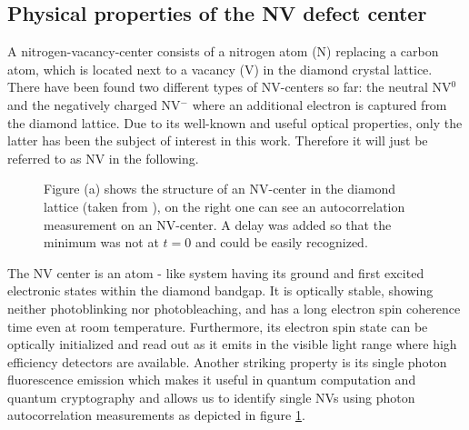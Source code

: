 \documentclass[12pt,a4paper]{article}
\begin{document}
\subsection{Physical properties of the NV defect center}
A nitrogen-vacancy-center consists of a nitrogen atom (N) replacing a carbon atom, which is located next to a vacancy (V) in the diamond crystal lattice. There have been found two different types of NV-centers so far: the neutral NV$^0$ and the negatively charged NV$^-$ where an additional electron is captured from the diamond lattice. Due to its well-known and useful optical properties, only the latter has been the subject of interest in this work. Therefore it will just be referred to as NV in the following. \\
\begin{figure}[H]
    \caption{Figure (a) shows the structure of an NV-center in the diamond lattice (taken from \cite{repprog}), on the right one can see an autocorrelation measurement on an NV-center. A delay was added so that the minimum was not at $t=0$ and could be easily recognized.}
\label{acm} 
\end{figure}
The NV center is an atom - like system having its ground and first excited electronic states within the diamond bandgap. It is optically stable, showing neither photoblinking nor photobleaching, and has a long electron spin coherence time even at room temperature. Furthermore, its electron spin state can be optically initialized and read out as it emits in the visible light range where high efficiency detectors are available. Another striking property is its single photon fluorescence emission which makes it useful in quantum computation and quantum cryptography\cite{qr}\cite{qc} and allows us to identify single NVs using photon autocorrelation measurements as depicted in figure \ref{acm}.\\
\end{document}
